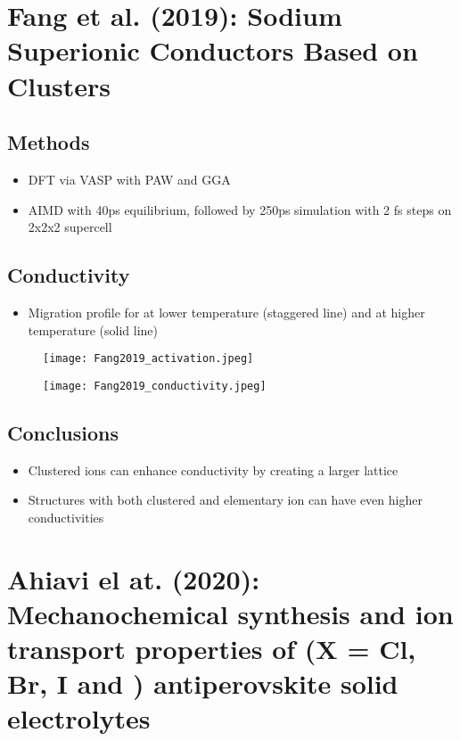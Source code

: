 \documentclass[10pt,a4paper, titlepage]{article}
\begin{document}
\section{Fang et al. (2019): Sodium Superionic Conductors Based on Clusters}

\subsection{Methods}

\begin{itemize}
  \item DFT via VASP with PAW and GGA
  \item AIMD with 40ps equilibrium, followed by 250ps simulation with 2 fs steps on 2x2x2 supercell
\end{itemize}

\subsection{Conductivity}

\begin{itemize}
  \item Migration profile for  at lower temperature (staggered line) and at higher temperature (solid line)
\end{itemize}

\begin{figure}[H]
\centering
\texttt{[image: Fang2019\_activation.jpeg]}
\end{figure}

\begin{figure}[H]
\centering
\texttt{[image: Fang2019\_conductivity.jpeg]}
\end{figure}

\subsection{Conclusions}

\begin{itemize}
  \item Clustered ions can enhance conductivity by creating a larger lattice
  \item Structures with both clustered and elementary ion can have even higher conductivities
\end{itemize}

\section{Ahiavi el at. (2020): Mechanochemical synthesis and ion transport properties of  (X = Cl, Br, I and ) antiperovskite solid electrolytes}
\end{document}
